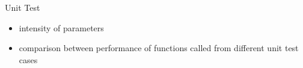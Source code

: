 \documentclass[11pt,aspectratio=169]{beamer}
\begin{document}
\begin{frame}{Unit Test}
  \begin{itemize}
    \item intensity of parameters
    \item comparison between performance of functions called from different unit test cases
  \end{itemize}
\end{frame}


\appendix
\end{document}
